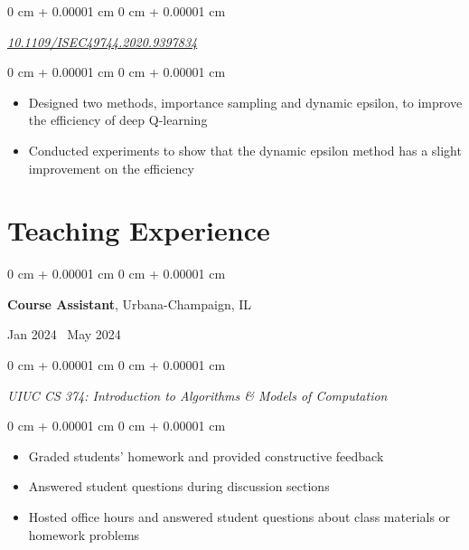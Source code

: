 \documentclass[10pt, letterpaper]{article}
\newenvironment{highlights}{
    \begin{itemize}[
        topsep=0.10 cm,
        parsep=0.10 cm,
        partopsep=0pt,
        itemsep=0pt,
        leftmargin=0 cm + 10pt
    ]
}{
    \end{itemize}
} %
\newenvironment{onecolentry}{
    \begin{adjustwidth}{
        0 cm + 0.00001 cm
    }{
        0 cm + 0.00001 cm
    }
}{
    \end{adjustwidth}
} %
\newenvironment{twocolentry}[2][]{
    \onecolentry
    \def\secondColumn{#2}
    \setcolumnwidth{\fill, 4.5 cm}
    \begin{paracol}{2}
}{
    \switchcolumn \raggedleft \secondColumn
    \end{paracol}
    \endonecolentry
} %
\begin{document}
    \vspace{0.10 cm}
    \begin{onecolentry}
        \href{https://doi.org/10.1109/ISEC49744.2020.9397834}{\textit{10.1109/ISEC49744.2020.9397834}}
    \end{onecolentry}

    \vspace{0.10 cm}
    \begin{onecolentry}
    \begin{highlights}
        \item Designed two methods, importance sampling and dynamic epsilon, to improve the efficiency of deep Q-learning
        \item Conducted experiments to show that the dynamic epsilon method has a slight improvement on the efficiency
    \end{highlights}
    \end{onecolentry}


\section{Teaching Experience}
    \begin{twocolentry}{Jan 2024 \textendash\ May 2024}
        \textbf{Course Assistant}, Urbana-Champaign, IL
    \end{twocolentry}

    \vspace{0.10 cm}
    \begin{onecolentry}
        \textit{UIUC CS 374: Introduction to Algorithms \& Models of Computation}
    \end{onecolentry}

    \vspace{0.10 cm}
    \begin{onecolentry}
    \begin{highlights}
        \item Graded students' homework and provided constructive feedback
        \item Answered student questions during discussion sections
        \item Hosted office hours and answered student questions about class materials or homework problems
    \end{highlights}
    \end{onecolentry}

    \vspace{0.20 cm}
\end{document}
